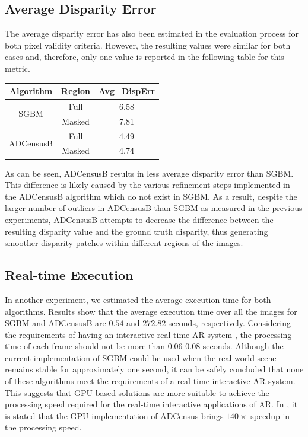 \subsection{Average Disparity Error}
The average disparity error has also been estimated in the evaluation process for both pixel validity criteria. However, the resulting values
were similar for both cases and, therefore, only one value is reported in the following table for this metric. \newline

\begin{minipage}{\linewidth}
\begin{center}
\label{tab:avgerr}
\begin{tabular}{ |c|c|c| }
\hline
Algorithm & Region & Avg\_DispErr \\ \hline
\multirow{2}{*}{SGBM} & Full & 6.58 \\ \cline{2-3}
& Masked & 7.81 \\ \hline
\multirow{2}{*}{ADCensusB} & Full & 4.49 \\ \cline{2-3}
& Masked & 4.74 \\ \hline
\end{tabular}
\end{center}
\end{minipage} \newline \newline

As can be seen, ADCensusB results in less average disparity error than SGBM. This difference is likely caused by the various refinement steps
implemented in the ADCensusB algorithm which do not exist in SGBM.
As a result, despite the larger number of outliers in ADCensusB than SGBM as measured in the previous experiments,
ADCensusB attempts to decrease the difference between the resulting disparity value and the ground truth disparity, thus generating smoother disparity patches
within different regions of the images.

\subsection{Real-time Execution}
In another experiment, we estimated the average execution time for both algorithms. Results show that the average execution time over all the images 
for SGBM and ADCensusB are $0.54$ and $272.82$ seconds, respectively.
Considering the requirements of having an interactive real-time AR system \cite{hertz00}, the processing time of each frame should not be more than 0.06-0.08 seconds.
Although the current implementation of SGBM could be used when the real world scene remains stable for approximately one second, it can be safely concluded that
none of these algorithms meet the requirements of a real-time interactive AR system.
This suggests that GPU-based solutions are more suitable to achieve the processing speed required for the real-time 
interactive applications of AR. In \cite{mei11}, it is stated that the GPU implementation of ADCensus brings $140\times$ speedup in the processing speed.

